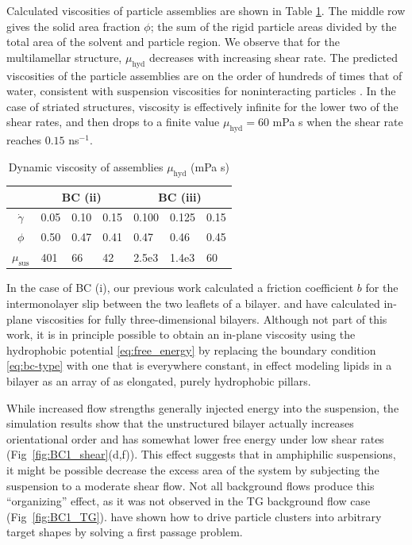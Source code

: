 \documentclass[prb,preprint,showpacs,preprintnumbers,amsmath,amssymb,longbibliography]{revtex4-1}
\begin{document}
Calculated viscosities of particle assemblies are shown
in Table \ref{tbl:bcii_visc}.
The middle row gives the solid area fraction $\phi$;
the sum of the rigid particle areas divided by the
total area of the solvent and particle region.
We observe that for the multilamellar structure,
$\mu_{\text{hyd}}$ decreases
with increasing shear rate.
The predicted viscosities of the particle assemblies
are on the order of hundreds of times that of water,
consistent with suspension viscosities for noninteracting
particles \cite{KONIJN201461}.
In the case of striated structures, viscosity is
effectively infinite for the lower two of the shear rates,
and then drops to a finite value $\mu_{\text{hyd}} = 60$ mPa s
when the shear rate reaches $0.15$ ns$^{-1}$.
\begin{table}
  \caption{Dynamic viscosity of assemblies $\mu_{\text{hyd}}$ (mPa s) 
\label{tbl:bcii_visc}
}
\centering
\begin{tabularx}{0.7\textwidth}{c|X|X|X||X|X|X}
&\multicolumn{3}{c||}{BC (ii)} & \multicolumn{3}{c}{BC (iii)}\\
\hline
  $\dot \gamma$ & 0.05 & 0.10 \quad & 0.15 & 0.100 & 0.125 & 0.15\\
  \hline
  $\phi$ & 0.50 & 0.47 & 0.41 & 0.47 & 0.46 & 0.45 \\
  \hline
  $\mu_{\text{sus}} $ & 401 & 66 & 42 & 2.5e3 & 1.4e3 & 60\\
\hline
\end{tabularx}
\end{table}

In the case of BC (i), our previous work\cite{Fu2022_JFM} calculated a
friction coefficient $b$ for the intermonolayer slip between the two leaflets
of a bilayer. \citet{denOtter2007,Zgorski2019} and
\citet{doi:10.1073/pnas.2100156118} have
calculated in-plane viscosities for fully three-dimensional bilayers.
Although not part of this work,
it is in principle possible to obtain an in-plane
viscosity using the hydrophobic potential
\eqref{eq:free_energy}
by replacing the boundary condition \eqref{eq:bc-type}
with one that is everywhere constant, in effect modeling
lipids in a bilayer as an array of as elongated, purely hydrophobic
pillars. 

While increased flow strengths generally injected energy into the suspension,
the simulation results show that the unstructured bilayer 
actually increases orientational order and has somewhat lower free energy 
under low shear rates (Fig~\ref{fig:BC1_shear}(d,f)).
This effect suggests that in amphiphilic suspensions,
it might be possible decrease the excess area of the system 
by subjecting the suspension to a moderate shear flow.
Not all background flows produce this ``organizing'' effect, as it was not
observed in the TG background flow case (Fig~\ref{fig:BC1_TG}).
\citet{PhysRevLett.128.256102} have shown how to drive particle clusters into arbitrary target shapes by solving
a first passage problem.
\end{document}
